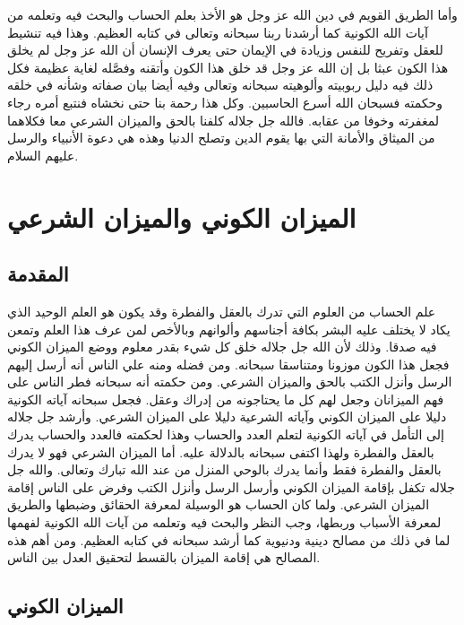 وأما الطريق القويم في دين الله عز وجل هو الأخذ بعلم الحساب والبحث فيه وتعلمه من آيات الله الكونية كما أرشدنا ربنا سبحانه وتعالى في كتابه العظيم. وهذا فيه تنشيط للعقل وتفريح للنفس وزيادة في الإيمان حتى يعرف الإنسان أن الله عز وجل لم يخلق هذا الكون عبثا بل إن الله عز وجل قد خلق هذا الكون وأتقنه وفصَّله لغاية عظيمة فكل ذلك فيه دليل ربوبيته وألوهيته سبحانه وتعالى وفيه أيضا بيان صفاته وشأنه في خلقه وحكمته فسبحان الله أسرع الحاسبين. وكل هذا رحمة بنا حتى نخشاه فنتبع أمره رجاء لمغفرته وخوفا من عقابه. فالله جل جلاله كلفنا بالحق والميزان الشرعي معا فكلاهما من الميثاق والأمانة التي بها يقوم الدين وتصلح الدنيا وهذه هي دعوة الأنبياء والرسل عليهم السلام.

\chapter{الميزان الكوني والميزان الشرعي}

\section{المقدمة}

علم الحساب من العلوم التي تدرك بالعقل والفطرة وقد يكون هو العلم الوحيد الذي يكاد لا يختلف عليه البشر بكافة أجناسهم وألوانهم وبالأخص لمن عرف هذا العلم وتمعن فيه صدقا. وذلك لأن الله جل جلاله خلق كل شيء بقدر معلوم ووضع الميزان الكوني فجعل هذا الكون موزونا ومتناسقا سبحانه. ومن فضله ومنه علي الناس أنه أرسل إليهم الرسل وأنزل الكتب بالحق والميزان الشرعي. ومن حكمته أنه سبحانه فطر الناس على فهم الميزانان وجعل لهم كل ما يحتاجونه من إدراك وعقل. فجعل سبحانه آياته الكونية دليلا على الميزان الكوني وآياته الشرعية دليلا على الميزان الشرعي. وأرشد جل جلاله إلى التأمل في آياته الكونية لتعلم العدد والحساب وهذا لحكمته فالعدد والحساب يدرك بالعقل والفطرة ولهذا اكتفى سبحانه بالدلالة عليه. أما الميزان الشرعي فهو لا يدرك بالعقل والفطرة فقط وأنما يدرك بالوحي المنزل من عند الله تبارك وتعالى. والله جل جلاله تكفل بإقامة الميزان الكوني وأرسل الرسل وأنزل الكتب وفرض على الناس إقامة الميزان الشرعي. ولما كان الحساب هو الوسيلة لمعرفة الحقائق وضبطها والطريق لمعرفة الأسباب وربطها، وجب النظر والبحث فيه وتعلمه من آيات الله الكونية لفهمها لما في ذلك من مصالح دينية ودنيوية كما أرشد سبحانه في  كتابه العظيم. ومن أهم هذه المصالح هي إقامة الميزان بالقسط لتحقيق العدل بين الناس. 

\section{الميزان الكوني}

